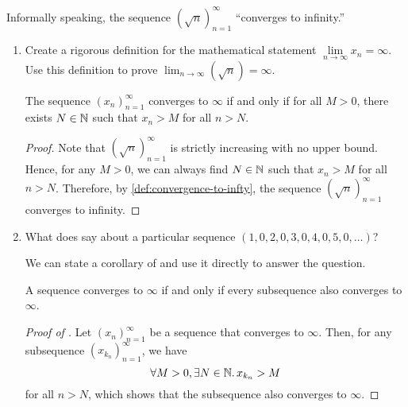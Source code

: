 \begin{problem}
  Informally speaking, the sequence $(\sqrt{n})_{n=1}^{\infty}$ ``converges to infinity.''

  \begin{enumerate}[label=(\alph*)]
      \item Create a rigorous definition for the mathematical statement $\lim\limits_{n \to \infty} x_{n} = \infty$. Use this
        definition to prove $\lim_{n \to \infty} (\sqrt{n}) = \infty$.

        \begin{definition}
          \label{def:convergence-to-infty}
          The sequence $(x_{n})_{n=1}^{\infty}$ converges to $\infty$ if and only if
          for all $M > 0$, there exists $N \in \mathbb{N}$ such that $x_{n} > M$ 
          for all $n > N$.
        \end{definition}

        \begin{proof}
          Note that $(\sqrt{n})_{n=1}^{\infty}$ is strictly increasing with no upper bound. 
          Hence, for any $M > 0$, we can always find $N \in \mathbb{N}$ such that $x_{n} > M$ for all $n > N$. 
          Therefore, by \ref{def:convergence-to-infty}, the sequence $(\sqrt{n})_{n=1}^{\infty}$ 
          converges to infinity.
        \end{proof}

      \item What does  say about a particular sequence
        $(1, 0, 2, 0, 3, 0, 4, 0, 5, 0, \ldots)$?

      
        We can state a corollary of  and use it directly to answer
        the question.

        \begin{corollary}
          \label{cor:sequence-to-infty-iff-all-subeq-to-infty}
          A sequence converges to $\infty$ if and only if every subsequence also
          converges to $\infty$.
        \end{corollary}

        \begin{proof}[Proof of ]
          Let $(x_{n})_{n=1}^{\infty}$ be a sequence that converges to $\infty$.
          Then, for any subsequence $(x_{k_{n}})_{n=1}^{\infty}$, we have
          \[
            \forall M > 0, \exists N \in \mathbb{N}.\, x_{k_{n}} > M
          \]
          for all $n > N$, which shows that the subsequence also converges to $\infty$.


\end{proof}
\end{enumerate}
\end{problem}
